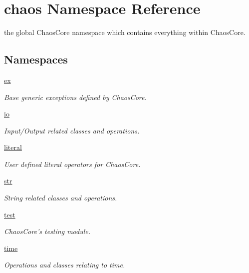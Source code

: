 \hypertarget{namespacechaos}{\section{chaos Namespace Reference}
\label{namespacechaos}
}


the global Chaos\-Core namespace which contains everything within Chaos\-Core.  


\subsection*{Namespaces}
\begin{DoxyCompactItemize}
\item 
\hyperlink{namespacechaos_1_1ex}{ex}
\begin{DoxyCompactList}\small\item\em Base generic exceptions defined by Chaos\-Core. \end{DoxyCompactList}\item 
\hyperlink{namespacechaos_1_1io}{io}
\begin{DoxyCompactList}\small\item\em Input/\-Output related classes and operations. \end{DoxyCompactList}\item 
\hyperlink{namespacechaos_1_1literal}{literal}
\begin{DoxyCompactList}\small\item\em User defined literal operators for Chaos\-Core. \end{DoxyCompactList}\item 
\hyperlink{namespacechaos_1_1str}{str}
\begin{DoxyCompactList}\small\item\em String related classes and operations. \end{DoxyCompactList}\item 
\hyperlink{namespacechaos_1_1test}{test}
\begin{DoxyCompactList}\small\item\em Chaos\-Core's testing module. \end{DoxyCompactList}\item 
\hyperlink{namespacechaos_1_1time}{time}
\begin{DoxyCompactList}\small\item\em Operations and classes relating to time. \end{DoxyCompactList}\end{DoxyCompactItemize}
